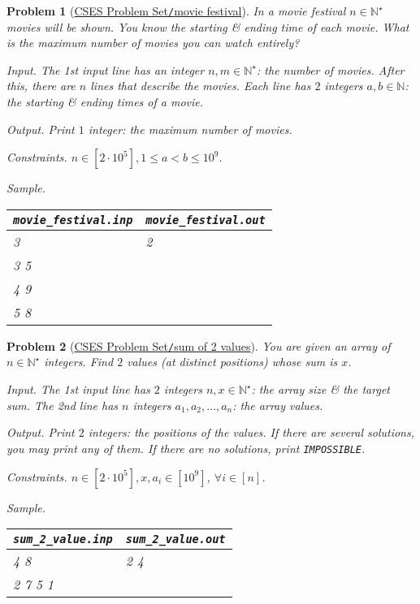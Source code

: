 \documentclass{article}
\newtheorem{problem}{Problem}
\begin{document}
\begin{problem}[\href{https://cses.fi/problemset/task/1629}{CSES Problem Set{\tt/}movie festival}]
    In a movie festival $n\in\mathbb{N}^\star$ movies will be shown. You know the starting \& ending time of each movie. What is the maximum number of movies you can watch entirely?
    \item {\sf Input.} The 1st input line has an integer $n,m\in\mathbb{N}^\star$: the number of movies. After this, there are $n$ lines that describe the movies. Each line has $2$ integers $a,b\in\mathbb{N}$: the starting \& ending times of a movie.
    \item {\sf Output.} Print $1$ integer: the maximum number of movies.
    \item {\sf Constraints.} $n\in[2\cdot10^5],1\le a < b\le10^9$.
    \item {\sf Sample.}
    \begin{table}[H]
        \centering
        \begin{tabular}{|l|l|}
            \hline
            \verb|movie_festival.inp| & \verb|movie_festival.out| \\
            \hline
            3 & 2 \\
            3 5 & \\
            4 9 & \\
            5 8 & \\           
            \hline
        \end{tabular}
    \end{table}
\end{problem}

\begin{problem}[\href{https://cses.fi/problemset/task/1640}{CSES Problem Set{\tt/}sum of 2 values}]
    You are given an array of $n\in\mathbb{N}^\star$ integers. Find $2$ values (at distinct positions) whose sum is $x$.
    \item {\sf Input.} The 1st input line has $2$ integers $n,x\in\mathbb{N}^\star$: the array size \& the target sum. The 2nd line has $n$ integers $a_1,a_2,\ldots,a_n$: the array values.
    \item {\sf Output.} Print $2$ integers: the positions of the values. If there are several solutions, you may print any of them. If there are no solutions, print {\tt IMPOSSIBLE}.
    \item {\sf Constraints.} $n\in[2\cdot10^5],x,a_i\in[10^9]$, $\forall i\in[n]$.
    \item {\sf Sample.}
    \begin{table}[H]
        \centering
        \begin{tabular}{|l|l|}
            \hline
            \verb|sum_2_value.inp| & \verb|sum_2_value.out| \\
            \hline
            4 8 & 2 4 \\
            2 7 5 1 & \\
            \hline
        \end{tabular}
    \end{table}
\end{problem}
\end{document}
